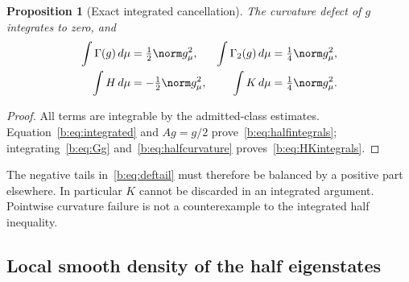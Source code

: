 \documentclass[11pt,a4paper]{article}
\numberwithin{equation}{section}
\newtheorem{proposition}[theorem]{Proposition}
\theoremstyle{definition}\newtheorem{definition}[theorem]{Definition}
\theoremstyle{remark}\newtheorem{remark}[theorem]{Remark}
\begin{document}
\begin{proposition}[Exact integrated cancellation]\label{b:prop:cancellation}
The curvature defect of $g$ integrates to zero, and
\begin{align}
 \int\Gamma(g)\,d\mu&=\tfrac12\norm g_\mu^2,
 &\int\Gamma_2(g)\,d\mu&=\tfrac14\norm g_\mu^2,\label{b:eq:halfintegrals}\\
 \int H\,d\mu&=-\tfrac12\norm g_\mu^2,
 &\int K\,d\mu&=\tfrac14\norm g_\mu^2.\label{b:eq:HKintegrals}
\end{align}
\end{proposition}
\begin{proof}
All terms are integrable by the admitted-class estimates. Equation~\eqref{b:eq:integrated} and $Ag=g/2$ prove~\eqref{b:eq:halfintegrals}; integrating~\eqref{b:eq:Gg} and~\eqref{b:eq:halfcurvature} proves~\eqref{b:eq:HKintegrals}.
\end{proof}

The negative tails in~\eqref{b:eq:deftail} must therefore be balanced by a positive part elsewhere. In particular $K$ cannot be discarded in an integrated argument. Pointwise curvature failure is not a counterexample to the integrated half inequality.

\subsection{Local smooth density of the half eigenstates}\label{b:sec:density}
\end{document}
